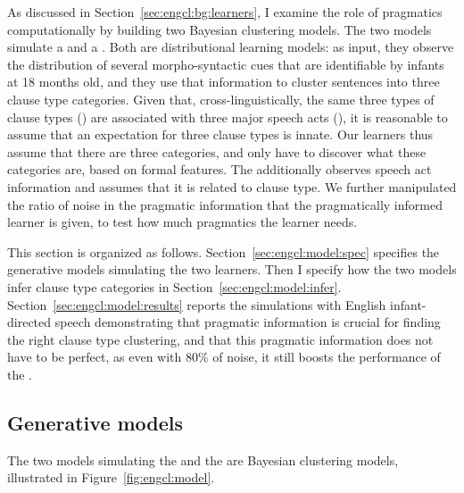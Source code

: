 As discussed in Section~\ref{sec:engcl:bg:learners}, I examine the role of pragmatics computationally by building two Bayesian clustering models. The two models simulate a \distlearner{} and a \praglearner{}. Both are distributional learning models: as input, they observe the distribution of several morpho-syntactic cues that are identifiable by infants at 18 months old, and they use that information to cluster sentences into three clause type categories. Given that, cross-linguistically, the same three types of clause types (\diis{}) are associated with three major speech acts (\aqrs{}), it is reasonable to assume that an expectation for three clause types is innate. Our learners thus assume that there are three categories, and only have to discover what these categories are, based on formal features. The \praglearner{} additionally observes speech act information and assumes that it is related to clause type. We further manipulated the ratio of noise in the pragmatic information that the pragmatically informed learner is given, to test how much pragmatics the learner needs.


This section is organized as follows. Section~\ref{sec:engcl:model:spec} specifies the generative models simulating the two learners. Then I specify how the two models infer clause type categories in Section~\ref{sec:engcl:model:infer}. Section~\ref{sec:engcl:model:results} reports the simulations with English infant-directed speech demonstrating that pragmatic information is crucial for finding the right clause type clustering, and that this pragmatic information does not have to be perfect, as even with 80\% of noise, it still boosts the performance of the \praglearner{}. 

\subsection{Generative models}
The two models simulating the \distlearner{} and the \praglearner{} are Bayesian clustering models, illustrated in Figure~\ref{fig:engcl:model}.%

\label{sec:engcl:model:spec}

